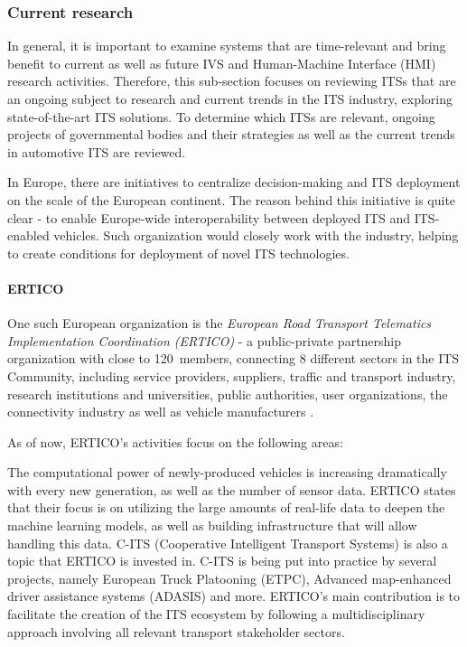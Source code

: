 \documentclass[0main.tex]{subfiles}
\begin{document}
\subsubsection{Current research}\label{sec-research}

In general, it is important to examine systems that are time-relevant and bring benefit to
current as well as future IVS and Human-Machine Interface (HMI) research activities. Therefore,
this sub-section focuses on reviewing ITSs that are an ongoing subject to research and
current trends in the ITS industry, exploring state-of-the-art ITS solutions. To determine which ITSs
are relevant, ongoing projects of governmental bodies and their
strategies as well as the current trends in automotive ITS are reviewed.

In Europe, there are initiatives to centralize decision-making and ITS deployment on the scale of 
the European continent. The reason behind this initiative is quite clear - to enable Europe-wide 
interoperability between deployed ITS and ITS-enabled vehicles. 
Such organization would closely work with the industry, helping to create conditions for
deployment of novel ITS technologies.

\paragraph{ERTICO}

One such European organization is the \emph{European Road Transport Telematics
Implementation Coordination (ERTICO)} - a public-private partnership organization
with close to 120~members, connecting 8 different sectors in the ITS Community, including
service providers, suppliers, traffic and transport industry, research institutions and
universities, public authorities, user organizations, the connectivity industry as well as
vehicle manufacturers \cite{ertico}.

As of now, ERTICO's activities focus on the following areas:

The computational power of newly-produced vehicles is increasing dramatically with every 
new generation, as well as the number of sensor data. ERTICO states that their focus is on utilizing 
the large amounts of real-life data to deepen the machine learning models, as well as building 
infrastructure that will allow handling this data. C-ITS (Cooperative Intelligent Transport
Systems) is also a topic that ERTICO is invested in. C-ITS is being put into practice by several projects, 
namely European Truck Platooning (ETPC), Advanced map-enhanced driver assistance systems (ADASIS) and 
more. ERTICO's main contribution is to facilitate the creation of the ITS ecosystem by following a
multidisciplinary approach involving all relevant transport stakeholder sectors.
\end{document}
